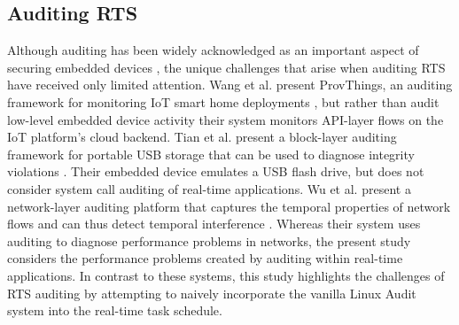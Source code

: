 \subsection{Auditing RTS} \mbox{Although} auditing has been widely acknowledged as an important aspect of securing embedded devices \cite{embedded_audit_1,embedded_audit_2,embedded_audit_3},
the unique challenges that arise when auditing RTS have received only limited attention.
Wang et al. present ProvThings, an auditing framework for monitoring IoT smart home deployments \cite{Wang2017},
  but rather than audit low-level embedded device activity their system monitors API-layer flows on the IoT platform's cloud backend.
Tian et al. present a block-layer auditing framework for portable USB storage  that can be used to diagnose integrity violations \cite{Tian2016}.
Their embedded device emulates a USB flash drive,
  but does not consider system call auditing of real-time applications.
Wu et al. present a network-layer auditing platform that captures the temporal properties of network flows and can
  thus detect temporal interference \cite{Wu2019}.
Whereas their system uses auditing to diagnose performance problems in networks,
  the present study considers the performance problems created by auditing within real-time applications.
In contrast to these systems, this study highlights
  the challenges of RTS auditing by attempting to naively incorporate the vanilla Linux Audit system into the real-time task schedule.
